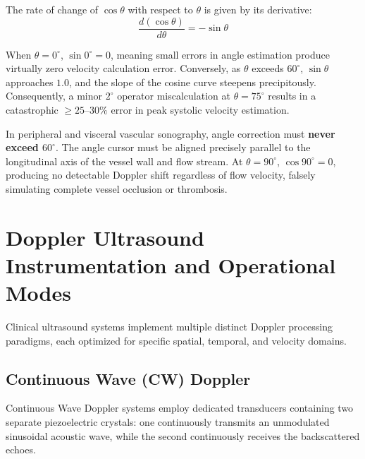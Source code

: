\documentclass[11pt,a4paper]{article}
\begin{document}
The rate of change of $\cos\theta$ with respect to $\theta$ is given by its derivative:
\begin{equation}
    \frac{d(\cos\theta)}{d\theta} = -\sin\theta
\end{equation}

When $\theta = 0^\circ$, $\sin 0^\circ = 0$, meaning small errors in angle estimation produce virtually zero velocity calculation error. Conversely, as $\theta$ exceeds $60^\circ$, $\sin\theta$ approaches $1.0$, and the slope of the cosine curve steepens precipitously. Consequently, a minor $2^\circ$ operator miscalculation at $\theta = 75^\circ$ results in a catastrophic $\ge 25\text{--}30\%$ error in peak systolic velocity estimation. 

\begin{clinicalpearl}
In peripheral and visceral vascular sonography, angle correction must \textbf{never exceed $60^\circ$}. The angle cursor must be aligned precisely parallel to the longitudinal axis of the vessel wall and flow stream. At $\theta = 90^\circ$, $\cos 90^\circ = 0$, producing no detectable Doppler shift regardless of flow velocity, falsely simulating complete vessel occlusion or thrombosis.
\end{clinicalpearl}

\section{Doppler Ultrasound Instrumentation and Operational Modes}

Clinical ultrasound systems implement multiple distinct Doppler processing paradigms, each optimized for specific spatial, temporal, and velocity domains.

\subsection{Continuous Wave (CW) Doppler}

Continuous Wave Doppler systems employ dedicated transducers containing two separate piezoelectric crystals: one continuously transmits an unmodulated sinusoidal acoustic wave, while the second continuously receives the backscattered echoes.
\end{document}
